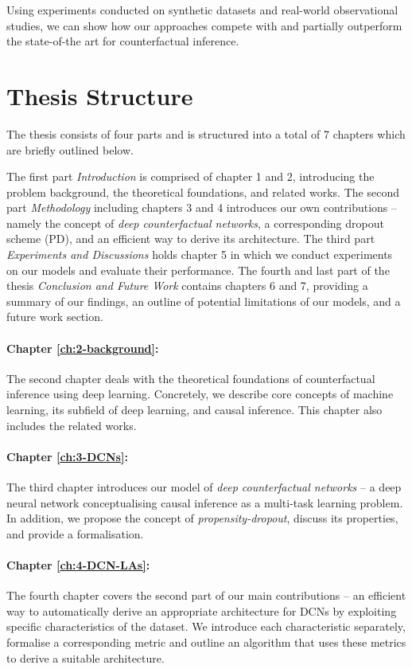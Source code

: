 Using experiments conducted on synthetic datasets and real-world observational studies, we can show how our approaches compete with and partially outperform the state-of-the art for counterfactual inference. 



\section{Thesis Structure}
The thesis consists of four parts and is structured into a total of 7 chapters which are briefly outlined below. 

The first part \emph{Introduction} is comprised of chapter 1 and 2, introducing the problem background, the theoretical foundations, and related works. The second part \emph{Methodology} including chapters 3 and 4 introduces our own contributions -- namely the concept of \emph{deep counterfactual networks}, a corresponding dropout scheme (PD), and an efficient way to derive its architecture. The third part \emph{Experiments and Discussions} holds chapter 5 in which we conduct experiments on our models and evaluate their performance. The fourth and last part of the thesis \emph{Conclusion and Future Work} contains chapters 6 and 7, providing a summary of our findings, an outline of potential limitations of our models, and a future work section. 

\paragraph{Chapter \ref{ch:2-background}: }
The second chapter deals with the theoretical foundations of counterfactual inference using deep learning. Concretely, we describe core concepts of machine learning, its subfield of deep learning, and causal inference. This chapter also includes the related works. 

\paragraph{Chapter \ref{ch:3-DCNs}: }
The third chapter introduces our model of \emph{deep counterfactual networks} -- a deep neural network conceptualising causal inference as a multi-task learning problem. In addition, we propose the concept of \emph{propensity-dropout}, discuss its properties, and provide a formalisation.
 
\paragraph{Chapter \ref{ch:4-DCN-LAs}: }
The fourth chapter covers the second part of our main contributions -- an efficient way to automatically derive an appropriate architecture for DCNs by exploiting specific characteristics of the dataset. We introduce each characteristic separately, formalise a corresponding metric and outline an algorithm that uses these metrics to derive a suitable architecture. 

